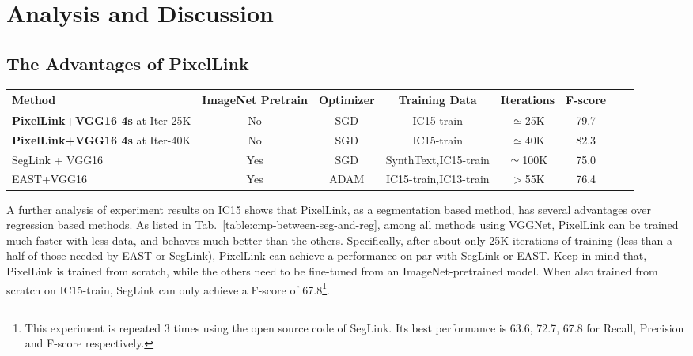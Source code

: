\documentclass[letterpaper]{article} \usepackage{aaai18}  \usepackage{times}  \usepackage{helvet}  \usepackage{courier}  \usepackage{url}  \usepackage{graphicx}
\begin{document}
	\section{Analysis and Discussion}
	\subsection{The Advantages of PixelLink}
	\label{sec:seg-vs-reg}
	\begin{table*}[!ht]
		\caption{Comparison of training speed and training data for IC15. SynthText~\cite{Gupta2016SynthText} is a synthetic dataset containing more than 0.8M images. All listed results for comparison are quoted from the corresponding original papers.}
		\label{table:cmp-between-seg-and-reg}
		\centering
		\begin{tabular}{|l|c|c|c|c|c|c|c|}
			\hline
			Method                          &ImageNet Pretrain  &Optimizer  &Training Data              &Iterations & F-score       \\
			\hline\hline
			\textbf{PixelLink+VGG16 4s} at Iter-25K  &No                     &SGD        &IC15-train                 &$\simeq$25K        &79.7   \\
			\hline
			\textbf{PixelLink+VGG16 4s} at Iter-40K  &No                     &SGD        &IC15-train                 &$\simeq$40K        &82.3   \\
			\hline
			SegLink + VGG16                 &Yes                    &SGD        &SynthText,IC15-train       &$\simeq$100K       &75.0   \\
			\hline
			EAST+VGG16                      &Yes                    &ADAM       &IC15-train,IC13-train      &$>$55K             &76.4   \\
			\hline
		\end{tabular}
	\end{table*}
	A further analysis of experiment results on IC15 shows that PixelLink, as a segmentation based method, has several advantages over regression based methods.  As listed in  Tab.~\ref{table:cmp-between-seg-and-reg}, among all methods using VGGNet, PixelLink can be trained much faster with less data, and behaves much better than the others. Specifically, after about only 25K iterations of training (less than a half of those needed by EAST or SegLink), PixelLink can achieve a performance on par with SegLink or EAST. Keep in mind that, PixelLink is trained from scratch, while the others need to be fine-tuned from an ImageNet-pretrained model. When also trained from scratch on IC15-train, SegLink can only achieve a F-score of 67.8\footnote{This experiment is repeated  3 times using the open source code of SegLink. Its best performance is 63.6, 72.7, 67.8 for Recall, Precision and F-score respectively.}.
	
\end{document}
